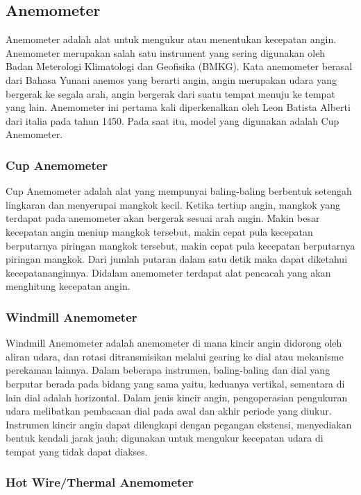 \subsection{Anemometer}

Anemometer adalah alat untuk mengukur atau menentukan kecepatan angin. Anemometer merupakan salah satu instrument yang sering 
digunakan oleh Badan Meterologi Klimatologi dan Geofisika (BMKG). Kata anemometer berasal dari Bahasa Yunani anemos yang berarti angin, angin 
merupakan udara yang bergerak ke segala arah, angin bergerak dari suatu tempat menuju ke tempat yang lain. Anemometer ini pertama kali diperkenalkan 
oleh Leon Batista Alberti dari italia pada tahun 1450. Pada saat itu, model yang digunakan adalah Cup Anemometer.

\subsubsection{Cup Anemometer}
	Cup Anemometer adalah alat yang mempunyai baling-baling berbentuk setengah lingkaran dan menyerupai mangkok kecil. Ketika tertiup angin, mangkok 
  yang terdapat pada anemometer akan bergerak sesuai arah angin. Makin besar kecepatan angin meniup mangkok tersebut, makin cepat pula kecepatan 
  berputarnya piringan mangkok tersebut, makin cepat pula kecepatan berputarnya piringan mangkok. Dari jumlah putaran dalam satu detik maka dapat 
  diketahui kecepatananginnya. Didalam anemometer terdapat alat pencacah yang akan menghitung kecepatan angin.
	
	\subsubsection{Windmill Anemometer}
	
	Windmill Anemometer adalah anemometer di mana kincir angin didorong oleh aliran udara, dan rotasi ditransmisikan melalui gearing ke dial atau 
  mekanisme perekaman lainnya. Dalam beberapa instrumen, baling-baling dan dial yang berputar berada pada bidang yang sama yaitu, keduanya vertikal, 
  sementara di lain dial adalah horizontal. Dalam jenis kincir angin, pengoperasian pengukuran udara melibatkan pembacaan dial pada awal dan akhir 
  periode yang diukur. Instrumen kincir angin dapat dilengkapi dengan pegangan ekstensi, menyediakan bentuk kendali jarak jauh; digunakan untuk mengukur 
  kecepatan udara di tempat yang tidak dapat diakses.
	
	\subsubsection{Hot Wire/Thermal Anemometer}
	
